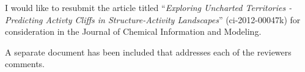 \documentclass[11pt]{newlfm}
\begin{document}
    \begin{newlfm}
      I would like to resubmit the article titled ``\emph{Exploring
        Uncharted Territories - Predicting Activty Cliffs in
        Structure-Activity Landscapes}'' (ci-2012-00047k) for consideration in the
      Journal of Chemical Information and Modeling.
      
A separate document has been included that addresses each of the
reviewers comments.

    \end{newlfm}
\end{document}

